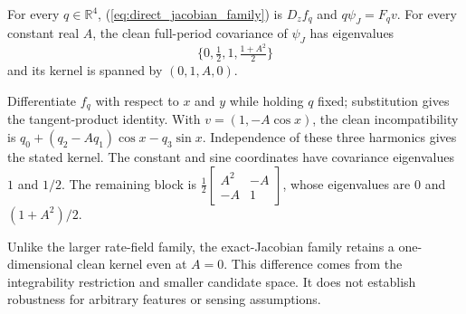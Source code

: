 \documentclass[journal]{IEEEtran}
\begin{document}
\begin{directproposition}
\label{prop:direct_jacobian_identifiability}
For every $q\in\mathbb R^4$, (\ref{eq:direct_jacobian_family}) is
$D_zf_q$ and $q\psi_J=F_qv$. For every constant real $A$, the
clean full-period covariance of $\psi_J$ has eigenvalues
\begin{equation}
 \{0,\tfrac12,1,\tfrac{1+A^2}{2}\}
\end{equation}
and its kernel is spanned by $(0,1,A,0)$.
\end{directproposition}
\begin{IEEEproof}
Differentiate $f_q$ with respect to $x$ and $y$ while holding $q$ fixed;
substitution gives the tangent-product identity. With
$v=(1,-A\cos x)$, the clean incompatibility is
$q_0+(q_2-Aq_1)\cos x-q_3\sin x$.
Independence of these three harmonics gives the stated kernel.
The constant and sine coordinates have covariance eigenvalues $1$ and
$1/2$. The remaining block is
$\frac12\left[\begin{smallmatrix}A^2&-A\\-A&1\end{smallmatrix}\right]$,
whose eigenvalues are $0$ and $(1+A^2)/2$.
\end{IEEEproof}
Unlike the larger rate-field family, the exact-Jacobian family retains a
one-dimensional clean kernel even at $A=0$. This difference comes from
the integrability restriction and smaller candidate space. It does not
establish robustness for arbitrary features or sensing assumptions.
\end{document}

